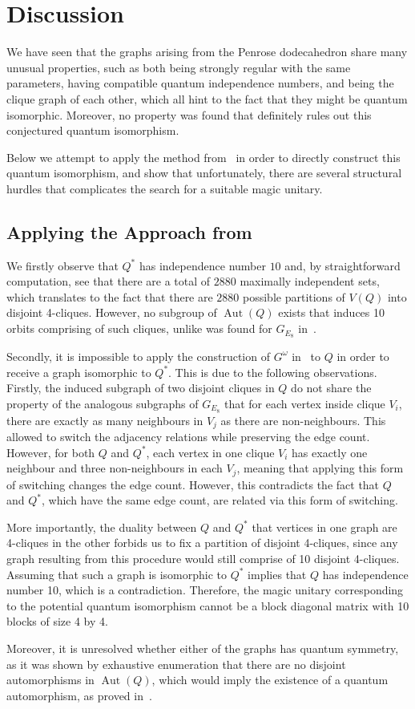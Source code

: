 \section{Discussion}

We have seen that the graphs arising from the Penrose dodecahedron share many unusual 
properties, such as both being strongly regular with the same parameters,
having compatible quantum independence numbers, and being the clique graph of each other,
which all hint to the fact that they might be quantum isomorphic.
Moreover, no property was found that definitely rules out this conjectured quantum isomorphism.

Below we attempt to apply the method from~\cite{ALCO_2024__7_2_515_0}
in order to directly construct this quantum isomorphism,
and show that unfortunately, there are several structural hurdles
that complicates the search for a suitable magic unitary.

\subsection{Applying the Approach from~\cite{ALCO_2024__7_2_515_0}}
We firstly observe that $Q^*$ has independence number $10$
and, by straightforward computation, see that there are a total of $2880$ maximally independent sets,
which translates to the fact that there are $2880$ possible partitions of $V(Q)$ into disjoint 4-cliques.
However, no subgroup of $\operatorname{Aut}(Q)$ exists that induces 10 orbits comprising of such cliques,
unlike was found for $G_{E_8}$ in~\cite{ALCO_2024__7_2_515_0}.

Secondly, it is impossible to apply the construction of $G^\omega$ in~\cite{ALCO_2024__7_2_515_0}
to $Q$ in order to receive a graph isomorphic to $Q^*$.
This is due to the following observations.
Firstly, the induced subgraph of two disjoint cliques in $Q$ do not share the property of the analogous subgraphs of $G_{E_8}$ that for each vertex inside clique $V_i$, there are exactly as many neighbours in $V_j$ as there are non-neighbours. 
This allowed to switch the adjacency relations while preserving the edge count.
However, for both $Q$ and $Q^*$, each vertex in one clique $V_i$ has exactly one neighbour and three non-neighbours in each $V_j$,
meaning that applying this form of switching changes the edge count.
However, this contradicts the fact that $Q$ and $Q^*$, which have the same edge count, are related via this form of switching.

More importantly, the duality between $Q$ and $Q^*$ that vertices in one graph are 4-cliques in the other 
forbids us to fix a partition of disjoint 4-cliques, since any graph resulting from this procedure would still comprise of 10 disjoint 4-cliques. 
Assuming that such a graph is isomorphic to $Q^*$ implies that $Q$ has independence number 10, which is a contradiction.
%
Therefore, the magic unitary corresponding to the potential quantum isomorphism cannot be a block diagonal matrix
with 10 blocks of size 4 by 4.

Moreover, it is unresolved whether either of the graphs has quantum symmetry,
as it was shown by exhaustive enumeration that there are no disjoint automorphisms in $\operatorname{Aut}(Q)$,
which would imply the existence of a quantum automorphism, as proved in~\cite{Schmidt_2020}.
